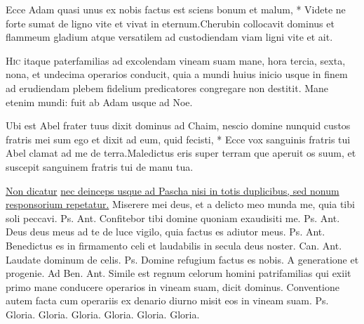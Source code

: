 \begin{multicols*}{2}
\begin{responsory}
{Ecce Adam quasi unus ex nobis factus est sciens bonum et malum, * Videte ne forte sumat de ligno vite et vivat in eternum.}{Cherubin collocavit dominus et flammeum gladium atque versatilem ad custodiendam viam ligni vite et ait.}
\end{responsory}
\lettrine[lines=2]{\zallmancaps \color{Red} H}{ic} itaque paterfamilias ad excolendam vineam suam mane, hora tercia, sexta, nona, et undecima operarios conducit, quia a mundi huius inicio usque in finem ad erudiendam plebem fidelium predicatores congregare non destitit. Mane etenim mundi: fuit ab Adam usque ad Noe.
\begin{responsory-doxology}
{Ubi est Abel frater tuus dixit dominus ad Chaim, nescio domine nunquid custos fratris mei sum ego et dixit ad eum, quid fecisti, * Ecce vox sanguinis fratris tui Abel clamat ad me de terra.}{Maledictus eris super terram que aperuit os suum, et suscepit sanguinem fratris tui de manu tua.}
\end{responsory-doxology}
\newline \ul{Non dicatur}  \ul{nec deinceps usque ad Pascha nisi in totis duplicibus, sed nonum responsorium repetatur.}%
 Miserere mei deus, et a delicto meo munda me, quia tibi soli peccavi. {\color{Red} Ps.}  {\color{Red} Ant.} Confitebor tibi domine quoniam exaudisiti me. {\color{Red} Ps.}  {\color{Red} Ant.} Deus deus meus ad te de luce vigilo, quia factus es adiutor meus. {\color{Red} Ps.}  {\color{Red} Ant.} Benedictus es in firmamento celi et laudabilis in secula deus noster. {\color{Red} Can.}  {\color{Red} Ant.} Laudate dominum de celis. {\color{Red} Ps.}  \V Domine refugium factus es nobis. \R A generatione et progenie. {\color{Red} Ad Ben. Ant.} Simile est regnum celorum homini patrifamilias qui exiit primo mane conducere operarios in vineam suam, dicit dominus.
 Conventione autem facta cum operariis ex denario diurno misit eos in vineam suam. {\color{Red} Ps.}   {\color{Red} Gloria.}   {\color{Red} Gloria.}   {\color{Red} Gloria.}   {\color{Red} Gloria.}  {\color{Red} Gloria.}  {\color{Red} Gloria.}

\end{multicols*}

